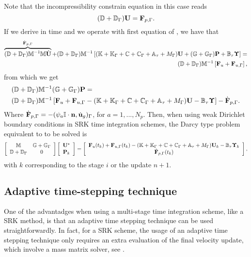Note that the incompressibility constrain equation in this case reads
\begin{equation}
\label{eq-C7_inc_constraint_eq_weak}
(\mathbb{D}+\mathbb{D}_\Gamma){\bf U}={\bf F}_{p,\Gamma}.
\end{equation}
If we derive  in time and we operate with first equation of , we have that
\begin{align}
\label{eq-C7_SRK_weak_u}
\overbrace{(\mathbb{D}+\mathbb{D}_\Gamma)\mathbb{M}^{-1}\mathbb{M}\dot{{\bf U}}}^{\dot{{\bf F}}_{p,\Gamma}}
+(\mathbb{D}+\mathbb{D}_\Gamma)\mathbb{M}^{-1}\left[(\mathbb{K}+\mathbb{K}_\Gamma+\mathbb{C}+\mathbb{C}_\Gamma+\mathbb{A}_\tau+M_\Gamma){\bf U}+(\mathbb{G}+\mathbb{G}_\Gamma){\bf P}+\mathbb{B}_\tau\boldsymbol{\Upsilon}\right] = \\\nonumber
(\mathbb{D}+\mathbb{D}_\Gamma)\mathbb{M}^{-1}\left[{\bf F}_u+{\bf F}_{u,\Gamma}\right],
\end{align}
from which we get
\begin{align}
\label{eq-C7_SRK_weak_dm1p}
&(\mathbb{D}+\mathbb{D}_\Gamma)\mathbb{M}^{-1}(\mathbb{G}+\mathbb{G}_\Gamma){\bf P} = \\\nonumber
&(\mathbb{D}+\mathbb{D}_\Gamma)\mathbb{M}^{-1}\left[{\bf F}_u+{\bf F}_{u,\Gamma}-(\mathbb{K}+\mathbb{K}_\Gamma+\mathbb{C}+\mathbb{C}_\Gamma+\mathbb{A}_\tau+M_\Gamma){\bf U}-\mathbb{B}_\tau\boldsymbol{\Upsilon}\right] - \dot{{\bf F}}_{p,\Gamma}.
\end{align}
Where $\dot{{\bf F}}_{p,\Gamma}=-(\psi_{a}\mathbb{I}\cdot{\bf n},\dot{{\bf u}}_g)_\Gamma$, for $a=1,...,N_p$. Then, when using weak Dirichlet boundary conditions in SRK time integration schemes, the Darcy type problem equivalent to  to be solved is
\begin{equation}
\label{eq-C7_SRK_upeta_RK_p_darcy_weak}
\left[\begin{array}{cc}
\mathbb{M}&\mathbb{G}+\mathbb{G}_\Gamma\\
\mathbb{D}+\mathbb{D}_\Gamma&0
\end{array}\right]\left[\begin{array}{c}
{\bf U}^*\\
{\bf P}_k
\end{array}\right]=\left[\begin{array}{c}
{\bf F}_u(t_k)+{\bf F}_{u,\Gamma}(t_k)-(\mathbb{K}+\mathbb{K}_\Gamma+\mathbb{C}+\mathbb{C}_\Gamma+\mathbb{A}_\tau+M_\Gamma){\bf U}_k-\mathbb{B}_\tau\boldsymbol{\Upsilon}_k\\
\dot{{\bf F}}_{p,\Gamma}(t_k)
\end{array}\right],
\end{equation}
with $k$ corresponding to the stage $i$ or the update $n+1$.

\subsection{Adaptive time-stepping technique}
One of the advantadges when using a multi-stage time integration scheme, like a SRK method, is that an adaptive time stepping technique can be used straightforwardly. In fact, for a SRK scheme, the usage of an adaptive time stepping technique only requires an extra evaluation of the final velocity update, which involve a mass matrix solver, see \cite{gustafsson_control_1991,gustafsson_control-theoretic_1994}.

